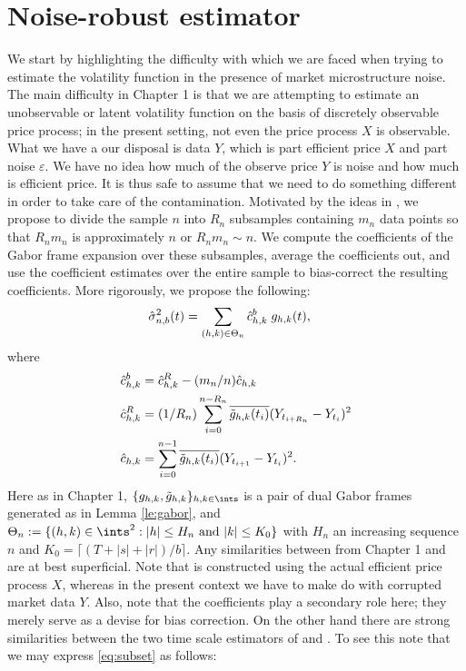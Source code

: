 \section{Noise-robust estimator} \label{sec:estimator2}
We start by highlighting the difficulty with which we are faced when trying to estimate the volatility function in the presence of market microstructure noise. The main difficulty in Chapter 1 is that we are attempting to estimate an unobservable or latent volatility function on the basis of discretely observable price process; in the present setting, not even the price process $X$ is observable. What we have a our disposal is data $Y$, which is part efficient price $X$ and part noise $\varepsilon$. We have no idea how much of the observe price $Y$ is noise and how much is efficient price. It is thus safe to assume that we need to do something different in order to take care of the contamination. Motivated by the ideas in \cite{Zhang2005}, we propose to divide the sample $n$ into $R_n$ subsamples containing $m_n$ data points so that $R_n m_n$ is approximately $n$ or $R_n m_n \sim n$. We compute the coefficients of the Gabor frame expansion over these subsamples, average the coefficients out, and use the coefficient estimates over the entire sample to bias-correct the resulting coefficients. More rigorously, we propose the following:
\begin{align}
  &\hat{\sigma}_{n,b}^2(t) = \sum_{(h,k) \in \Theta_n} \hat{c}_{h,k}^b\;g_{h,k}(t), \label{eq:noiseest}
\end{align}
where
\begin{align}
  &\hat{c}_{h,k}^b = \hat{c}_{h,k}^R - (m_n/n)\hat{c}_{h,k} \\
  &\hat{c}_{h,k}^R = (1/R_n)\sum_{i =0}^{n -R_n} \overline{\tilde{g}_{h,k}(t_i)} (Y_{t_{i+R_n}} - Y_{t_i})^2 \label{eq:subset} \\
  &\hat{c}_{h,k} = \sum_{i =0}^{n-1} \overline{\tilde{g}_{h,k}(t_i)} (Y_{t_{i+1}} - Y_{t_i})^2.
  \label{}
\end{align}
Here as in Chapter 1, $\{g_{h,k}, \tghk\}_{h,k \in \ints}$ is a pair of dual Gabor frames generated as in Lemma \eqref{le:gabor}, and $\Theta_n := \{(h,k) \in \ints^2 : |h| \le H_n \text{ and }|k| \le K_0\}$ with $H_n$ an increasing sequence $n$ and $K_0= \lceil (T + |s| + |r|)/b \rceil$. Any similarities between \svn from Chapter 1 and \svnb are at best superficial. Note that \svn is constructed using the actual efficient price process $X$, whereas in the present context we have to make do with corrupted market data $Y$. Also, note that the coefficients \cnhk play a secondary role here; they merely serve as a devise for bias correction. On the other hand there are strong similarities between the two time scale estimators of \cite{Zhang2005} and \cite{Zu2014}. To see this note that we may express \eqref{eq:subset} as follows:
